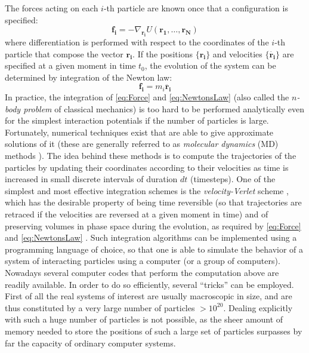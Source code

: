 The forces acting on each $i$-th particle are known once that a configuration is specified:
\begin{equation}
	\mathbf{f_i} = - \nabla_{\mathbf{r_i}} U(\mathbf{r_{1}, \ldots, r_{N}})
	\label{eq:Force}
\end{equation}
where differentiation is performed with respect to the coordinates of the $i$-th particle that compose the vector $\mathbf{r_i}$.
If the positions $\{\mathbf{r_i}\}$ and velocities $\{\mathbf{\dot{r_i}}\}$ are specified at a given moment in time $t_0$, the evolution of the system can be determined by integration of the Newton law:
\begin{equation}
	\mathbf{f_i} = m_i \mathbf{\ddot{r_i}} 
	\label{eq:NewtonsLaw}
\end{equation}
In practice, the integration of \autoref{eq:Force} and \autoref{eq:NewtonsLaw} (also called the \emph{$n$-body problem} of classical mechanics) is too hard to be performed analytically even for the simplest interaction potentials if the number of particles is large.  
Fortunately, numerical techniques exist that are able to give approximate solutions of it (these are generally referred to as \emph{molecular dynamics} (MD) methods \cite{allen1989computer, frenkel2001understanding}). The idea behind these methods is to compute the trajectories of the particles by updating their coordinates according to their velocities as time is increased in small discrete intervals of duration $dt$ (timesteps).
One of the simplest and most effective integration schemes is the \emph{velocity-Verlet} scheme \cite{frenkel2001understanding}, which has the desirable property of being time reversible (so that trajectories are retraced if the velocities are reversed at a given moment in time) and of preserving volumes in phase space during the evolution, as required by \autoref{eq:Force} and \autoref{eq:NewtonsLaw} \cite{frenkel2001understanding}.
Such integration algorithms can be implemented using a programming language of choice, so that one is able to simulate the behavior of a system of interacting particles using a computer (or a group of computers).
Nowadays several computer codes that perform the computation above are readily available. In order to do so efficiently, several ``tricks'' can be employed. 
First of all the real systems of interest are usually macroscopic in size, and are thus constituted by a very large number of particles $> 10^{20}$. Dealing explicitly with such a huge number of particles is not possible, as the sheer amount of memory needed to store the positions of such a large set of particles surpasses by far the capacity of ordinary computer systems. 
